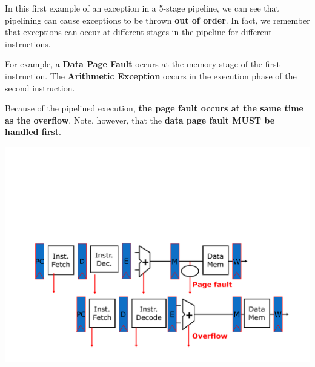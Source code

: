 \begin{examplebox}
    In this first example of an exception in a 5-stage pipeline, we can see that pipelining can cause exceptions to be thrown \textbf{out of order}. In fact, we remember that exceptions can occur at different stages in the pipeline for different instructions.

    \highspace
    For example, a \textbf{Data Page Fault} occurs at the memory stage of the first instruction. The \textbf{Arithmetic Exception} occurs in the execution phase of the second instruction.

    Because of the pipelined execution, \textbf{the page fault occurs at the same time as the overflow}. Note, however, that the \textbf{data page fault MUST be handled first}.

    \begin{center}
        \includegraphics[width=\textwidth]{img/exceptions-in-the-5-stage-pipeline-2.pdf}
    \end{center}
\end{examplebox}

\newpage

